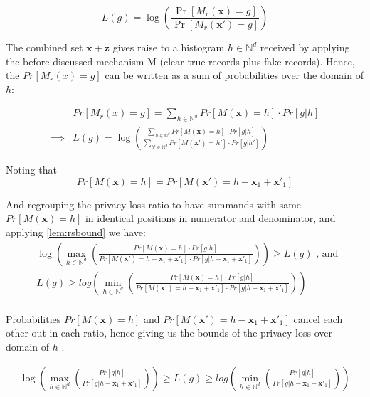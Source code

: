\documentclass[11pt]{article}
\newcommand{\bbx}{\pmb{x}}
\newcommand{\bbz}{\pmb{z}}
\newcommand{\N}{\mathbb{N}}
\begin{document}
\begin{equation} \label{eq:lgbound}
L(g) = \log \left ( \frac{\Pr[M_r(\bbx) = g]}{\Pr[M_r(\bbx') = g]} \right )
\end{equation}

The combined set $\bbx + \bbz$ gives raise to a histogram $h \in \N^d$ received by applying the before discussed mechanism M (clear true records plus fake records).  Hence, the $Pr [ M_r(x) = g ]$ can be written as a sum of probabilities over the domain of $h$:

 \begin{align*}
 & Pr [ M_r(x) = g ] = \sum_{h \in \N^d} Pr \left [  M(\bbx) = h \right ] \cdot Pr [ g | h ]  \\
\implies &  L(g) =  \log  \left ( \frac{  \sum_{h \in \N^d} Pr \left [  M(\bbx) = h \right ] \cdot  Pr [ g | h ]   }{    \sum_{h' \in \N^d}  Pr \left [  M(\bbx') = h' \right ] \cdot   Pr[ g | h']   } \right )
\end{align*}

Noting that
\[
 Pr \left [  M(\bbx) = h \right ]  =  Pr \left [  M(\bbx') = h - \bbx_1 + \bbx'_1 \right ]
 \] 
 
And regrouping  the privacy loss ratio to have summands with same $Pr \left [  M(\bbx) = h \right ]$ in identical positions in numerator and denominator, and applying \eqref{lem:rsbound} we have:
 \begin{align*}
& \log \left ( \max_{h \in \N^d} \left ( \frac{  Pr \left [  M(\bbx) = h \right ] \cdot  Pr [ g | h ]   } {   Pr \left [  M(\bbx') = h - \bbx_1 + \bbx'_1 \right ] \cdot  Pr [ g | h  - \bbx_1 + \bbx'_1  ]  }    \right ) \right ) \ge L(g) \text{ , and } \\
& L(g) \ge  log \left ( \min_{h \in \N^d} \left ( \frac{  Pr \left [  M(\bbx) = h \right ] \cdot  Pr [ g | h ]   } {   Pr \left [  M(\bbx') = h - \bbx_1 + \bbx'_1 \right ] \cdot  Pr [ g | h  - \bbx_1 + \bbx'_1  ]  }  \right ) \right ) \\
\end{align*}

Probabilities $Pr \left [  M(\bbx) = h \right ]$ and $ Pr \left [  M(\bbx') = h - \bbx_1 + \bbx'_1 \right ]$ cancel each other out in each ratio, hence giving us the bounds of the privacy loss over domain of $h$ .

\begin{align*}
\log \left ( \max_{h \in \N^d} \left ( \frac{  Pr [ g | h ]   } { Pr [ g | h  - \bbx_1 + \bbx'_1  ]  }    \right ) \right ) \ge L(g) \ge  log \left ( \min_{h \in \N^d}  \left ( \frac{  Pr [ g | h ]   } {    Pr [ g | h  - \bbx_1 + \bbx'_1  ]  }  \right ) \right )
\end{align*}
\end{document}
